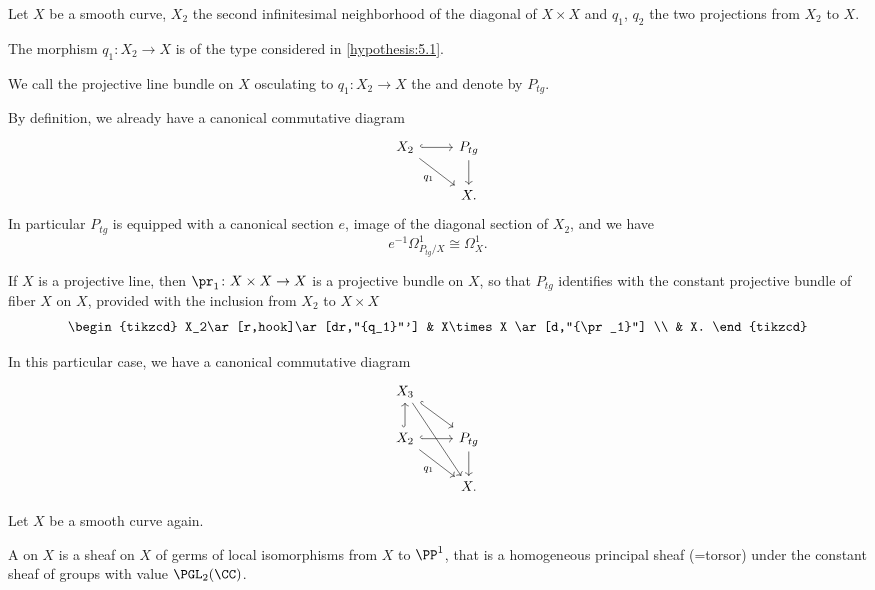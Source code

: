 Let $X$ be a smooth curve, $X_2$ the second infinitesimal neighborhood of the
diagonal of $X\times X$ and $q_1$, $q_2$ the two projections from $X_2$ to $X$.

The morphism $q_1\colon X_2\to X$ is of the type considered in
\ref{hypothesis:5.1}.

\begin{definition}
  We call the projective line bundle on $X$ osculating to $q_1\colon X_2\to X$
  the  and denote by $P_{tg}$.
\end{definition}

By definition, we already have a canonical commutative diagram
\begin{equation}
  \begin{tikzcd}
    X_2\ar[r,hook]\ar[dr,"{q_1}"'] & P_{tg}\ar[d] \\
    & X.
  \end{tikzcd}
\end{equation}
In particular $P_{tg}$ is equipped with a canonical section $e$, image of the
diagonal section of $X_2$, and we have
\begin{equation}\label{eq:5.4.2}
  e^{-1}\Omega_{P_{tg}/X}^1 \cong \Omega_X^1.
\end{equation}

\begin{para}\label{construction:5.5}
  If $X$ is a projective line, then $\pr_1\colon X\times X\to X$ is a projective
  bundle on $X$, so that $P_{tg}$ identifies with the constant projective bundle
  of fiber $X$ on $X$, provided with the inclusion from $X_2$ to $X\times X$
  \[
  \begin{tikzcd}
    X_2\ar[r,hook]\ar[dr,"{q_1}"'] & X\times X \ar[d,"{\pr_1}"] \\
    & X.
  \end{tikzcd}
  \]

  In this particular case, we have a canonical commutative diagram
  \[
  \begin{tikzcd}
    X_3\ar[dr,hook]\ar[ddr] & \\
    X_2\ar[u,hook]\ar[r,hook]\ar[dr,"{q_1}"'] & P_{tg} \ar[d] \\
    & X.
  \end{tikzcd}
  \]
\end{para}

Let $X$ be a smooth curve again.
\begin{definition}\label{defn:5.6}
  A  on $X$ is a sheaf on $X$ of germs of local
  isomorphisms from $X$ to $\PP^1$, that is a homogeneous principal sheaf
  (=torsor) under the constant sheaf of groups with value $\PGL_2(\CC)$.
\end{definition}

